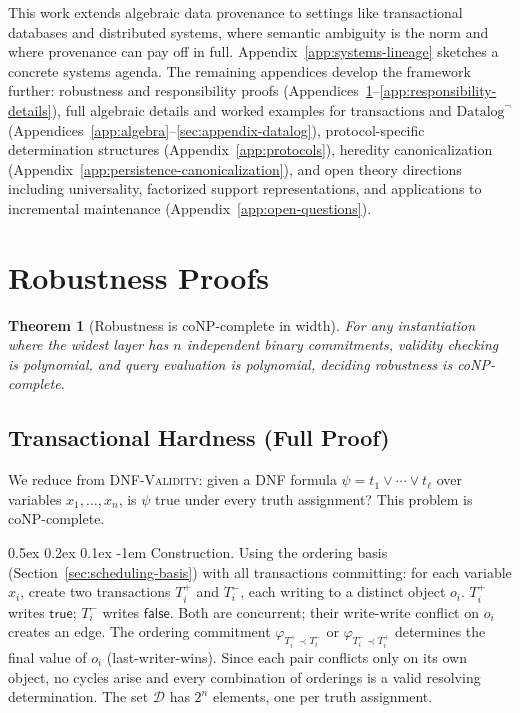 \documentclass[acmsmall,review,anonymous]{acmart}
\makeatletter
\renewcommand{\paragraph}{\@startsection{paragraph}{4}{\z@}%
  {0.5ex \@plus 0.2ex \@minus 0.1ex}%
  {-1em}%
  {\normalfont\normalsize\bfseries}}
\newtheorem{theorem}{Theorem}
\theoremstyle{remark}
\numberwithin{definition}{section}
\numberwithin{theorem}{section}
\numberwithin{lemma}{section}
\numberwithin{corollary}{section}
\numberwithin{remark}{section}
\numberwithin{example}{section}
\numberwithin{observation}{section}
\numberwithin{assumption}{section}
\makeatother
\begin{document}
This work extends algebraic data
provenance to settings like transactional databases and
distributed systems, where semantic ambiguity is the norm and where
provenance can pay off in full.
Appendix~\ref{app:systems-lineage} sketches a concrete systems
agenda.
The remaining appendices develop the framework further:
robustness and responsibility proofs
(Appendices~\ref{app:robustness-proofs}--\ref{app:responsibility-details}),
full algebraic details and worked examples for transactions and
$\mbox{Datalog}^\neg$
(Appendices~\ref{app:algebra}--\ref{sec:appendix-datalog}),
protocol-specific determination structures
(Appendix~\ref{app:protocols}),
heredity canonicalization
(Appendix~\ref{app:persistence-canonicalization}),
and open theory directions including universality, factorized support
representations, and applications to incremental maintenance
(Appendix~\ref{app:open-questions}).

\pagebreak
\appendix

\section{Robustness Proofs}
\label{app:robustness-proofs}

\begin{theorem}[Robustness is coNP-complete in width]
  \label{thm:robustness-conp}
  For any instantiation where the widest layer has $n$ independent
  binary commitments, validity checking is polynomial, and query
  evaluation is polynomial, deciding robustness is coNP-complete.
\end{theorem}

\subsection{Transactional Hardness (Full Proof)}

We reduce from \textsc{DNF-Validity}: given a DNF formula
$\psi = t_1 \vee \cdots \vee t_\ell$ over variables $x_1, \ldots, x_n$,
is $\psi$ true under every truth assignment?
This problem is coNP-complete.

\paragraph{Construction.}
Using the ordering basis (Section~\ref{sec:scheduling-basis}) with all
transactions committing:
for each variable $x_i$, create two transactions $T_i^+$ and $T_i^-$,
each writing to a distinct object $o_i$.
$T_i^+$ writes $\mathsf{true}$; $T_i^-$ writes $\mathsf{false}$.
Both are concurrent; their write-write conflict on $o_i$ creates an edge.
The ordering commitment $\varphi_{T_i^+ \prec T_i^-}$ or
$\varphi_{T_i^- \prec T_i^+}$ determines the final value of $o_i$
(last-writer-wins).
Since each pair conflicts only on its own object, no cycles arise and
every combination of orderings is a valid resolving determination.
The set $\mathcal{D}$ has $2^n$ elements, one per truth assignment.
\end{document}
